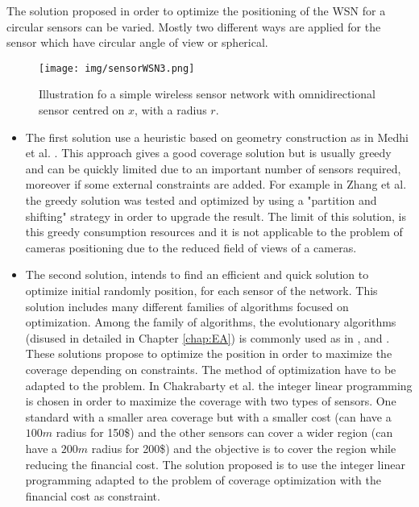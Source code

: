 The solution proposed in order to optimize the positioning of the WSN for a circular sensors can be varied. Mostly two different ways are applied for the sensor which have circular angle of view or spherical.\\
\begin{figure}[t!]
	\center
{}
   \texttt{[image: img/sensorWSN3.png]}
  \caption{Illustration fo a  simple wireless sensor network with omnidirectional sensor centred on $x$, with a radius $r$.}\label{fig:WsnSensorNet}
  \endminipage\hfill
\end{figure}
\begin{itemize}


\item	The first solution use a heuristic based on geometry construction as in  Medhi et al. \cite{175*medhi2013}. This approach gives a good coverage solution but is usually greedy and can be quickly limited due to an important number of sensors required, moreover if some external constraints are added.  For example in Zhang et al. \cite{174*zhang2016} the greedy solution was tested and optimized by using a "partition and shifting" strategy in order to upgrade the result.
The limit of this solution,  is this greedy consumption resources and it is not applicable to the problem of cameras positioning due to the reduced field of views of a cameras.  \\
\item	The second solution, intends to find an efficient and quick solution to optimize initial randomly position, for each sensor of the network.  
This solution includes many different families of algorithms focused on optimization.
Among the family of algorithms, the evolutionary algorithms (disused in detailed in Chapter \ref{chap:EA}) is commonly used as in \cite{200*kulkarni2011,59*wang2008}, and \cite{150*chakrabarty2002}. \\
These solutions propose to optimize the position in order to maximize the coverage depending on constraints. The method of optimization have to be adapted to the problem. 
In Chakrabarty et al. \cite{150*chakrabarty2002} the integer linear programming  is chosen in order to maximize the coverage with two types of sensors. One standard with a smaller area coverage but with a smaller cost (can have a $100m$ radius for 150\$) and the other sensors can cover a wider region (can have a $200m$  radius for 200\$) and the objective is to cover the region while reducing the financial cost. The solution proposed is to use the integer linear programming adapted to the problem of coverage optimization with the financial cost as constraint. \\

\end{itemize}
